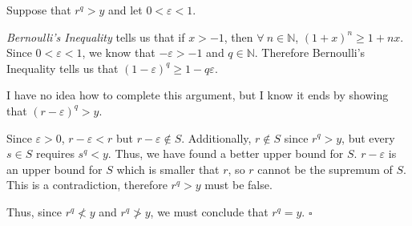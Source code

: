 \documentclass[a4paper]{article}
\begin{document}
Suppose that $r^q > y$ and let $0 < \varepsilon < 1$.

\textit{Bernoulli's Inequality} tells us that if $x > -1$, then $\forall\ n \in \mathbb N$, $(1 + x)^n \ge 1 + nx$. Since $0 < \varepsilon < 1$, we know that $-\varepsilon > -1$ and $q \in \mathbb N$. Therefore Bernoulli's Inequality tells us that $(1 - \varepsilon)^q \ge 1 - q\varepsilon$.

I have no idea how to complete this argument, but I know it ends by showing that $(r - \varepsilon)^q > y$.

Since $\varepsilon > 0$, $r - \varepsilon < r$ but $r - \varepsilon \notin S$. Additionally, $r \notin S$ since $r^q > y$, but every $s \in S$ requires $s^q < y$. Thus, we have found a better upper bound for $S$. $r - \varepsilon$ is an upper bound for $S$ which is smaller that $r$, so $r$ cannot be the supremum of $S$. This is a contradiction, therefore $r^q > y$ must be false.

Thus, since $r^q \not < y$ and $r^q \not > y$, we must conclude that $r^q = y$. \hfill $\square$
\end{document}
